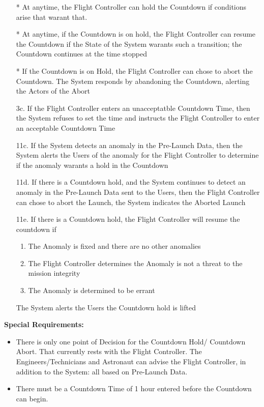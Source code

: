 \documentclass[letterpaper]{article}
\begin{document}
\begin{itemize}
\item[*]  At anytime, the Flight Controller can hold the Countdown
if conditions arise that warant that.
\item[*] At anytime, if the Countdown is on hold, the Flight
Controller can resume the Countdown if the State of the System warants
such a transition;  the Countdown continues at the time stopped
\item[*] If the Countdown is on Hold, the Flight Controller can chose
to
abort the Countdown.  The System responds by abandoning the Countdown,
alerting the Actors of the Abort
\item[3c.]If the Flight Controller enters an unacceptatble Countdown
Time, then the System refuses to set the time and instructs the
Flight Controller to enter an acceptable Countdown Time
\item[11c.]  If the System detects an anomaly in the
Pre-Launch Data, then the System alerts the Users of the anomaly for
the Flight Controller to determine if the anomaly warants a hold in
the
Countdown
\item[11d.]  If there is a Countdown hold, and the System continues to
detect an anomaly in the Pre-Launch Data sent to the Users, then the
Flight Controller can chose to abort the Launch, the System indicates
the Aborted Launch
\item[11e.]  If there is a Countdown hold, the Flight Controller will
resume the countdown if
\begin{enumerate}
\item The Anomaly is fixed and there are no other anomalies
\item The Flight Controller determines the Anomaly is not a threat
to the mission integrity
\item The Anomaly is determined to be errant
\end{enumerate}
The System alerts the Users the Countdown hold is lifted
\end{itemize}
\textbf{Special Requirements: }
\begin{itemize}
\item There is only one point of Decision for the Countdown Hold/
Countdown Abort.  That currently rests with the Flight Controller.  The
Engineers/Technicians and Astronaut can advise the Flight Controller,
in addition to the System:  all based on Pre-Launch Data.
\item There must be a Countdown Time of 1 hour entered before the
Countdown can begin.
\end{itemize}
\end{document}
